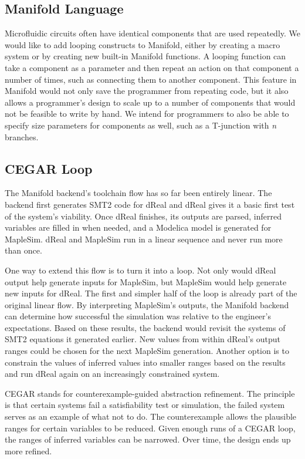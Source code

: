 \subsection{Manifold Language}

Microfluidic circuits often have identical components that are used repeatedly.
We would like to add looping constructs to Manifold, either by creating a
macro system or by creating new built-in Manifold functions. A looping function
can take a component as a parameter and then repeat an action on that
component a number of times, such as connecting them to another component.
This feature in Manifold would not only save the programmer from repeating
code, but it also allows a programmer's design to scale up to a number of
components that would not be feasible to write by hand. We intend for
programmers to also be able to specify size parameters for components as
well, such as a T-junction with \emph{n} branches.

\subsection{CEGAR Loop}

The Manifold backend's toolchain flow has so far been entirely linear.
The backend first generates SMT2 code for dReal and dReal gives it a basic first test of the system's viability.
Once dReal finishes, its outputs are parsed, inferred variables are filled in when needed, and a Modelica model is generated for MapleSim.
dReal and MapleSim run in a linear sequence and never run more than once.

One way to extend this flow is to turn it into a loop.
Not only would dReal output help generate inputs for MapleSim, but MapleSim would help generate new inputs for dReal.
The first and simpler half of the loop is already part of the original linear flow.
By interpreting MapleSim's outputs, the Manifold backend can determine how successful the simulation was relative to the engineer's expectations.
Based on these results, the backend would revisit the systems of SMT2 equations it generated earlier.
New values from within dReal's output ranges could be chosen for the next MapleSim generation.
Another option is to constrain the values of inferred values into smaller ranges based on the results and run dReal again on an increasingly constrained system.

CEGAR stands for counterexample-guided abstraction refinement.
The principle is that certain systems fail a satisfiability test or simulation, the failed system serves as an example of what not to do.
The counterexample allows the plausible ranges for certain variables to be reduced.
Given enough runs of a CEGAR loop, the ranges of inferred variables can be narrowed.
Over time, the design ends up more refined.


